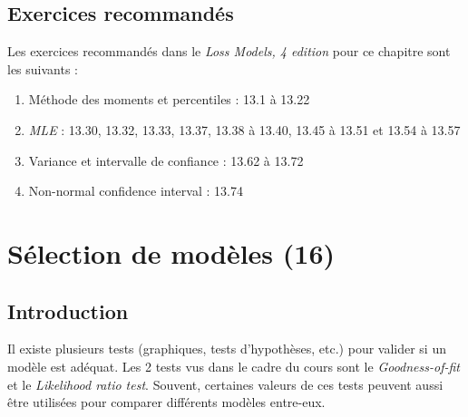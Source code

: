 \documentclass[12pt, french]{report}
\begin{document}
\section{Exercices recommandés}
Les exercices recommandés dans le \emph{Loss Models, 4 edition} pour ce chapitre sont les suivants : 
\begin{enumerate}[label=\faAngleRight]
\item Méthode des moments et percentiles : 13.1 à 13.22
\item \emph{MLE} : 13.30, 13.32, 13.33, 13.37, 13.38 à 13.40, 13.45 à 13.51 et 13.54 à 13.57
\item Variance et intervalle de confiance : 13.62 à 13.72
\item Non-normal confidence interval : 13.74 
\end{enumerate}





\chapter{Sélection de modèles (16)}
\section{Introduction}
Il existe plusieurs tests (graphiques, tests d'hypothèses, etc.) pour valider si un modèle est adéquat. Les 2 tests vus dans le cadre du cours sont le \emph{Goodness-of-fit} et le \emph{Likelihood ratio test}. Souvent, certaines valeurs de ces tests peuvent aussi être utilisées pour comparer différents modèles entre-eux. 
\end{document}
